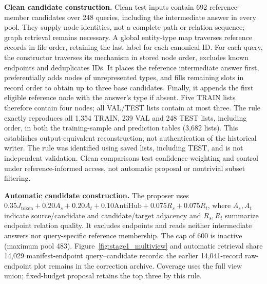 \documentclass{article} %
\newcommand{\rev}[1]{{\color{blue}#1}}
\begin{document}
\noindent\textbf{Clean candidate construction.} Clean test inputs contain \rev{692 reference-member candidates over 248 queries}, including the intermediate answer in every pool. They supply node identities, not a complete path or relation sequence; graph retrieval remains necessary. A global entity-type map traverses reference records in file order, retaining the last label for each canonical ID. For each query, the constructor traverses its mechanism in stored node order, excludes known endpoints and deduplicates IDs. It places the reference intermediate answer first, preferentially adds nodes of unrepresented types, and fills remaining slots in record order to obtain up to three base candidates. Finally, it appends the first eligible reference node with the answer's type if absent. \rev{Five TRAIN lists therefore contain four nodes; all VAL/TEST lists contain at most three. The rule exactly reproduces all 1,354 TRAIN, 239 VAL and 248 TEST lists, including order, in both the training-sample and prediction tables (3,682 lists).} This establishes output-equivalent reconstruction, not authentication of the historical writer. The rule was identified using saved lists, including TEST, and is not independent validation. Clean comparisons test confidence weighting and control under reference-informed access, not automatic proposal or nontrivial subset filtering.

\noindent\textbf{Automatic candidate construction.} The proposer uses $0.35J_{\mathrm{token}}+0.20A_s+0.20A_t+0.10\mathrm{AntiHub}+0.075R_s+0.075R_t$, where $A_s,A_t$ indicate source/candidate and candidate/target adjacency and $R_s,R_t$ summarize endpoint relation quality. It excludes endpoints and reads neither intermediate answers nor query-specific reference membership. The cap of 600 is inactive (maximum pool 483). Figure~\ref{fig:stage1_multiview} and automatic retrieval share \rev{14,029} manifest-endpoint query--candidate records; the earlier 14,041-record raw-endpoint plot remains in the correction archive. Coverage uses the full view union; fixed-budget proposal retains the top three by this rule.
\end{document}
